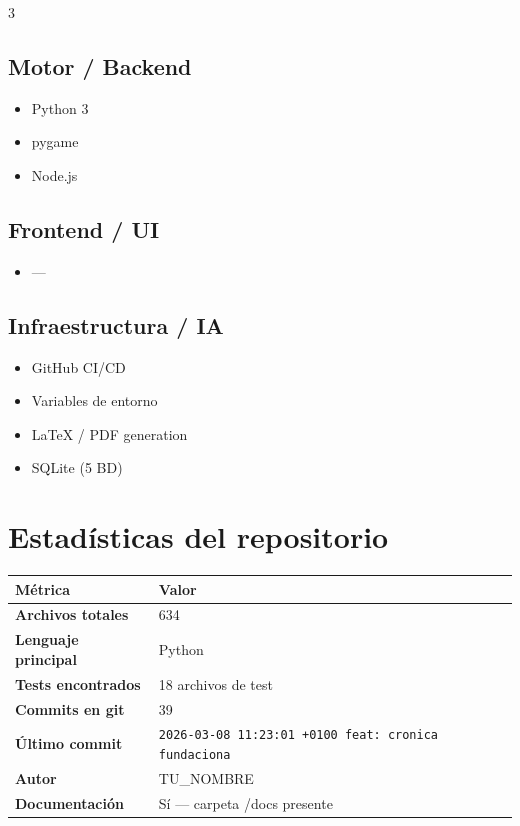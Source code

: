 \documentclass[10pt,a4paper]{article}
\begin{document}
\begin{multicols}{3}

\subsection*{Motor / Backend}
\begin{itemize}[leftmargin=1em, itemsep=1pt, topsep=1pt]
  \item Python 3
  \item pygame
  \item Node.js
\end{itemize}

\columnbreak
\subsection*{Frontend / UI}
\begin{itemize}[leftmargin=1em, itemsep=1pt, topsep=1pt]
  \item ---
\end{itemize}

\columnbreak
\subsection*{Infraestructura / IA}
\begin{itemize}[leftmargin=1em, itemsep=1pt, topsep=1pt]
  \item GitHub CI/CD
  \item Variables de entorno
  \item LaTeX / PDF generation
  \item SQLite (5 BD)
\end{itemize}

\end{multicols}

\section{Estadísticas del repositorio}

\begin{tabularx}{\linewidth}{>{\bfseries}p{4.5cm} X}
  \toprule
  Métrica & Valor \\
  \midrule
  Archivos totales & 634 \\[2pt]
  Lenguaje principal & Python \\[2pt]
  Tests encontrados & 18 archivos de test \\[2pt]
  Commits en git & 39 \\[2pt]
  Último commit & \texttt{\small2026-03-08 11:23:01 +0100 feat: cronica fundaciona} \\[2pt]
  Autor & TU\_NOMBRE \\[2pt]
  Documentación & Sí — carpeta /docs presente \\
  \bottomrule
\end{tabularx}
\end{document}
